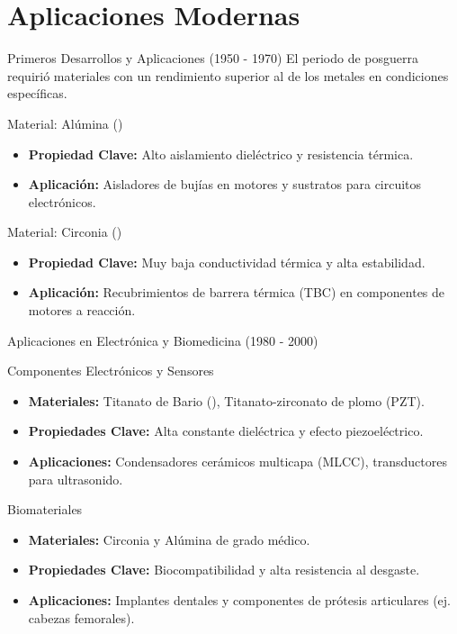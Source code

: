 \section{Aplicaciones Modernas}

\begin{frame}{Primeros Desarrollos y Aplicaciones (1950 - 1970)}
  El periodo de posguerra requirió materiales con un rendimiento superior al de
  los metales en condiciones específicas.

  \begin{block}{Material: Alúmina ()}
    \begin{itemize}[<+->]
      \item \textbf{Propiedad Clave:} Alto aislamiento dieléctrico y
        resistencia térmica.
      \item \textbf{Aplicación:} Aisladores de bujías en motores y sustratos
        para circuitos electrónicos.
    \end{itemize}
  \end{block}

  \begin{block}{Material: Circonia ()}
    \begin{itemize}[<+->]
      \item \textbf{Propiedad Clave:} Muy baja conductividad térmica y alta
        estabilidad.
      \item \textbf{Aplicación:} Recubrimientos de barrera térmica (TBC) en
        componentes de motores a reacción.
    \end{itemize}
  \end{block}
\end{frame}

\begin{frame}{Aplicaciones en Electrónica y Biomedicina (1980 - 2000)}
  \begin{block}{Componentes Electrónicos y Sensores}
    \begin{itemize}[<+->]
      \item \textbf{Materiales:} Titanato de Bario (),
        Titanato-zirconato de plomo (PZT).
      \item \textbf{Propiedades Clave:} Alta constante dieléctrica y efecto
        piezoeléctrico.
      \item \textbf{Aplicaciones:} Condensadores cerámicos multicapa (MLCC),
        transductores para ultrasonido.
    \end{itemize}
  \end{block}

  \begin{block}{Biomateriales}
    \begin{itemize}[<+->]
      \item \textbf{Materiales:} Circonia y Alúmina de grado médico.
      \item \textbf{Propiedades Clave:} Biocompatibilidad y alta resistencia al
        desgaste.
      \item \textbf{Aplicaciones:} Implantes dentales y componentes de prótesis
        articulares (ej. cabezas femorales).
    \end{itemize}
  \end{block}
\end{frame}


